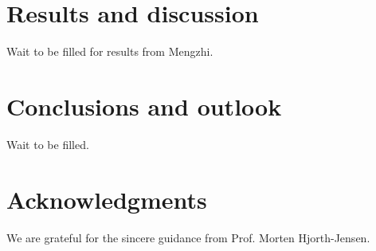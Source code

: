 \documentclass{article}
\begin{document}
	\section{Results and discussion}\label{results}
	Wait to be filled for results from Mengzhi. 
	
	\section{Conclusions and outlook}\label{conclude}
	Wait to be filled. 
	
	\section*{Acknowledgments}
	We are grateful for the sincere guidance from Prof. Morten Hjorth-Jensen. 
	
%	
%	
\end{document}
